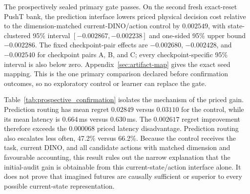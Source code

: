 \documentclass[10pt]{article}
\theoremstyle{definition}
\theoremstyle{remark}
\begin{document}
The prospectively sealed primary gate passes.  On the second fresh exact-reset PushT bank, the
prediction interface lowers priced physical decision cost relative to the
dimension-matched current-DINO/action control by $0.002549$, with
state-clustered 95\% interval $[-0.002867,-0.002238]$ and one-sided 95\% upper
bound $-0.002286$.  The fixed checkpoint-pair effects are $-0.002680$, $-0.002428$, and
$-0.002540$ for checkpoint pairs A, B, and C; every checkpoint-specific 95\%
interval is also below zero.  Appendix~\ref{sec:artifact-map} gives the exact
seed mapping.  This is the one primary
comparison declared before confirmation outcomes, so no exploratory control or learner
can replace the gate.

\begin{table}[H]
\centering
\caption{Prospective-confirmation operating point at $\lambda=0.002$, equally weighting
the three fixed checkpoint pairs after averaging 39 tasks within each fresh
state.  The control is faster and receives current DINO for free, but the
prediction interface reduces physical regret enough to lower priced cost by
7.9\% relative to the control.}
\label{tab:prospective_confirmation}
\small

\end{table}

Table~\ref{tab:prospective_confirmation} isolates the mechanism of the priced gain.  Prediction
routing has mean regret $0.02849$ versus $0.03110$ for the control, while its
mean latency is $0.664$\,ms versus $0.630$\,ms.  The $0.002617$ regret
improvement therefore exceeds the $0.000068$ priced latency disadvantage.
Prediction routing also escalates less often, 47.2\% versus 66.2\%.  Because the
control receives the task, current DINO, and all candidate actions with matched
dimension and favourable accounting, this result rules out the narrow
explanation that the initial-audit gain is obtainable from this current-state/action
interface alone.  It does not prove that imagined futures are causally
sufficient or superior to every possible current-state representation.
\end{document}
